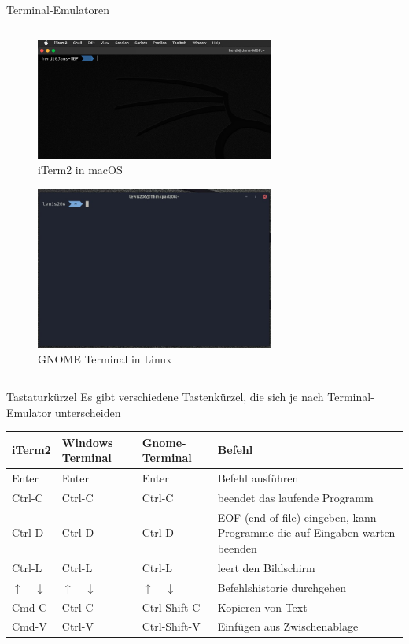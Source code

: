 \begin{frame}{Terminal-Emulatoren}
\begin{columns}
\begin{column}{0.5\textwidth}
      \begin{figure}
        \includegraphics[width=0.7\textwidth]{images/iterm2.jpg}
      \caption*{iTerm2 in macOS}
      \end{figure}
      \begin{figure}
        \includegraphics[width=0.7\textwidth]{images/gnome-terminal.jpg}
      \caption*{GNOME Terminal in Linux}
      \end{figure}
    \end{column}
  \end{columns}
  
\end{frame}

\begin{frame}{Tastaturkürzel}
  Es gibt verschiedene Tastenkürzel, die sich je nach Terminal-Emulator unterscheiden
  \vspace{1em}\\ 
  \begin{tabu}{>{\ttfamily}l | >{\ttfamily}l | >{\ttfamily}l | X[,L]}
    iTerm2 & Windows Terminal & Gnome-Terminal & Befehl \\
    \hline
    Enter & Enter & Enter & Befehl ausführen \\
    Ctrl-C & Ctrl-C & Ctrl-C & beendet das laufende Programm \\
    Ctrl-D & Ctrl-D & Ctrl-D & EOF (end of file) eingeben, kann Programme die auf Eingaben warten beenden \\
    Ctrl-L & Ctrl-L & Ctrl-L & leert den Bildschirm \\
    $\uparrow \quad \downarrow$ & $\uparrow \quad \downarrow$ & $\uparrow \quad \downarrow$ & Befehlshistorie durchgehen\\
    Cmd-C& Ctrl-C & Ctrl-Shift-C & Kopieren von Text \\
    Cmd-V& Ctrl-V & Ctrl-Shift-V & Einfügen aus Zwischenablage \\
  \end{tabu}
\end{frame}

